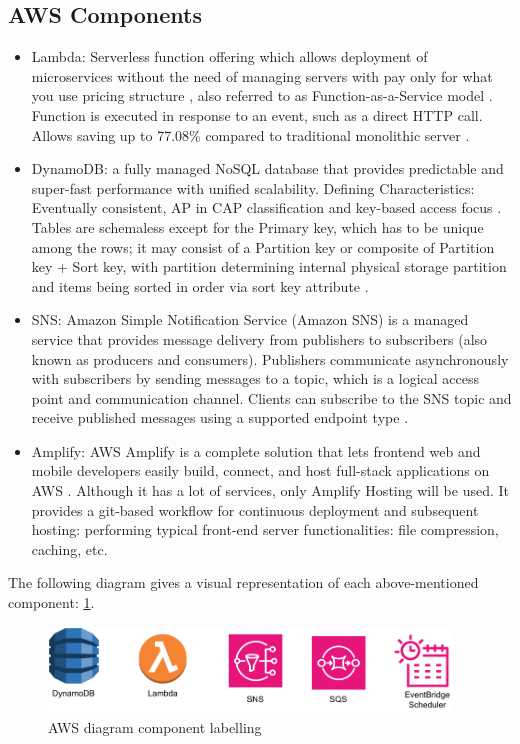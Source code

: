 \subsection{AWS Components}
\begin{itemize}
    \item Lambda: Serverless function offering which allows deployment of microservices without the need of managing servers with pay only for what you use pricing structure \cite{LambdaCostSave}, also referred to as Function-as-a-Service model \cite{MALAWSKI2020502}. Function is executed in response to an event, such as a direct HTTP call.  Allows saving up to 77.08\% compared to traditional monolithic server \cite{LambdaCostSave}.
    \item DynamoDB: a fully managed NoSQL database that provides predictable and super-fast performance with unified scalability. Defining Characteristics: Eventually consistent, AP in CAP classification and key-based access focus \cite{DynamoDB}. Tables are schemaless except for the Primary key, which has to be unique among the rows; it may consist of a Partition key or composite of Partition key + Sort key, with partition determining internal physical storage partition and items being sorted in order via sort key attribute \cite{awsDynamoWebsite}. 
    \item SNS: Amazon Simple Notification Service (Amazon SNS) is a managed service that provides message delivery from publishers to subscribers (also known as producers and consumers). Publishers communicate asynchronously with subscribers by sending messages to a topic, which is a logical access point and communication channel. Clients can subscribe to the SNS topic and receive published messages using a supported endpoint type \cite{sns}. 
    \item Amplify: AWS Amplify is a complete solution that lets frontend web and mobile developers easily build, connect, and host full-stack applications on AWS \cite{amplify}. Although it has a lot of services, only Amplify Hosting will be used. It provides a git-based workflow for continuous deployment and subsequent hosting: performing typical front-end server functionalities: file compression, caching, etc.
\end{itemize}
The following diagram gives a visual representation of each above-mentioned component: \ref{fig:awsComponents}.
\begin{figure}
    
    \centering
    \includegraphics[width=0.95\textwidth,keepaspectratio]{../images/AWS_components.pdf}
    \caption{AWS diagram component labelling}
    \label{fig:awsComponents}
\end{figure}
